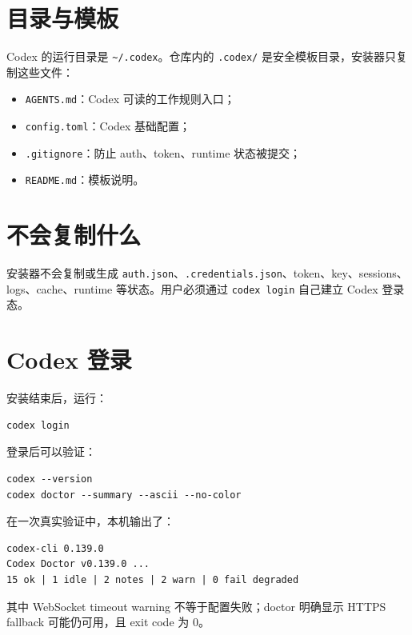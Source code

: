 \documentclass[11pt,a4paper]{ctexbook}
\begin{document}
\section{目录与模板}

Codex 的运行目录是 \texttt{\textasciitilde/.codex}。仓库内的 \texttt{.codex/} 是安全模板目录，安装器只复制这些文件：

\begin{itemize}[leftmargin=2em]
  \item \texttt{AGENTS.md}：Codex 可读的工作规则入口；
  \item \texttt{config.toml}：Codex 基础配置；
  \item \texttt{.gitignore}：防止 auth、token、runtime 状态被提交；
  \item \texttt{README.md}：模板说明。
\end{itemize}

\section{不会复制什么}

\begin{warnbox}
安装器不会复制或生成 \texttt{auth.json}、\texttt{.credentials.json}、token、key、sessions、logs、cache、runtime 等状态。用户必须通过 \texttt{codex login} 自己建立 Codex 登录态。
\end{warnbox}

\section{Codex 登录}

安装结束后，运行：

\begin{lstlisting}[language={}]
codex login
\end{lstlisting}

登录后可以验证：

\begin{lstlisting}[language={}]
codex --version
codex doctor --summary --ascii --no-color
\end{lstlisting}

在一次真实验证中，本机输出了：

\begin{lstlisting}[language={}]
codex-cli 0.139.0
Codex Doctor v0.139.0 ...
15 ok | 1 idle | 2 notes | 2 warn | 0 fail degraded
\end{lstlisting}

其中 WebSocket timeout warning 不等于配置失败；doctor 明确显示 HTTPS fallback 可能仍可用，且 exit code 为 0。
\end{document}
